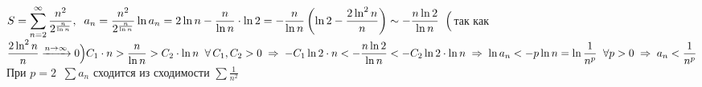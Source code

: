 \documentclass[a4paper]{article}
\begin{document}
    \begin{problem}
        $\displaystyle S = \sum_{n = 2}^{\infty} \frac{n^2}{2^\frac{n}{\ln n}}, \;\; a_n = \frac{n^2}{2^\frac{n}{\ln n}}
        \\[4 pt]
        \ln a_n = 2 \ln n - \frac{n}{\ln n} \cdot \ln 2 = -\frac{n}{\ln n} \left(\ln 2 - \frac{2 \ln^2 n}{n}\right) \sim 
        -\frac{n \ln 2}{\ln n} \;\; \Bigl($так как $\displaystyle \frac{2 \ln^2 n}{n} \xrightarrow{n \to \infty} 0 \Bigr)
        \\[4 pt]
        C_1 \cdot n > \frac{n}{\ln n} > C_2 \cdot \ln n \;\; \forall \, C_1, C_2 > 0 \; \Rightarrow \; 
        -C_1 \ln 2 \cdot n < -\frac{n \ln 2}{\ln n} < -C_2 \ln 2 \cdot \ln n \; \Rightarrow \; 
        \ln a_n < -p \ln n = \ln \frac{1}{n^p} \;\; \forall p > 0 \;\Rightarrow\; a_n < \frac{1}{n^p}$
        \\[4 pt]
        При $\displaystyle p = 2 \;\; \sum a_n$ сходится из сходимости $\displaystyle \sum \frac{1}{n^2}$
    \end{problem}
\end{document}
